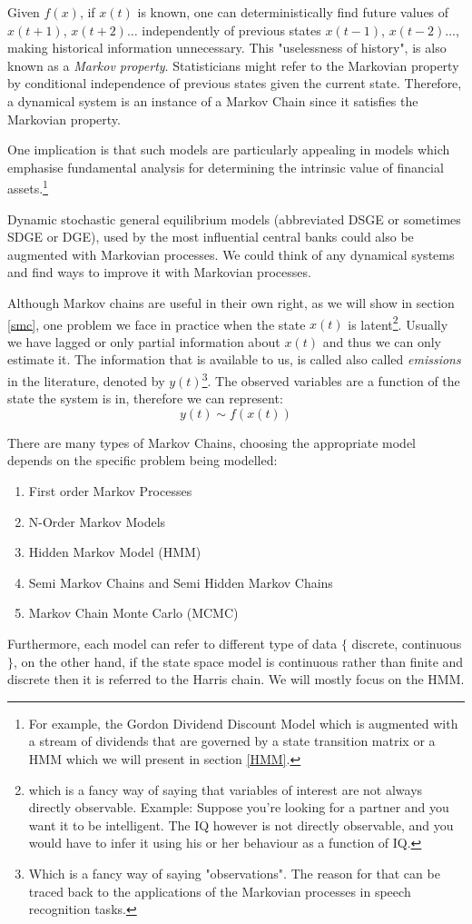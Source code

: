 \documentclass[a4paper,12pt]{article}
\theoremstyle{definition}
\begin{document}
Given $f(x)$, if $x(t)$ is known, one can deterministically find future values of $x(t+1)$, $x(t+2) \dots$ independently of previous states $x(t-1)$, $x(t-2) \dots$, making historical information unnecessary. This "uselessness of history", is also known as a \textit{Markov property}. Statisticians might refer to the Markovian property by conditional independence of previous states given the current state. Therefore, a dynamical system is an instance of a Markov Chain since it satisfies the Markovian property. 

One implication is that such models are particularly appealing in models which emphasise fundamental analysis for determining the intrinsic value of financial assets.\footnote{For example, the Gordon Dividend Discount Model which is augmented with a stream of dividends that are governed by a state transition matrix or a HMM which we will present in section \ref{HMM}.} 

Dynamic stochastic general equilibrium models (abbreviated DSGE or sometimes SDGE or DGE), used by the most influential central banks could also be augmented with Markovian processes.  We could think of any dynamical systems and find ways to improve it with Markovian processes. 

Although Markov chains are useful in their own right, as  we will show in section \ref{smc}, one problem we face in practice when the state $x(t)$ is latent\footnote{which is a fancy way of saying that variables of interest are not always directly observable. Example: Suppose you're looking for a partner and you want it to be intelligent. The IQ however is not directly observable, and you would have to infer it using his or her behaviour as a function of IQ. }.  Usually we have lagged or only partial information about $x(t)$ and thus we can only estimate it. The information that is available to us, is called also called \textit{emissions} in the literature, denoted by $y(t)$\footnote{Which is a fancy way of saying "observations". The reason for that can be traced back to the applications of the Markovian processes in speech recognition tasks.}. The observed variables are a function of the state the system is in, therefore we can represent: 
\begin{equation}
y(t) \sim f(x(t))
\end{equation}

There are many types of Markov Chains, choosing the appropriate model depends on the specific problem being modelled:
\begin{enumerate}
\item First order Markov Processes
\item N-Order Markov Models
\item Hidden Markov Model (HMM)
\item Semi Markov Chains and Semi Hidden Markov Chains
\item Markov Chain Monte Carlo (MCMC)
\end{enumerate}
Furthermore, each model can refer to different type of data $\{$ discrete, continuous $\}$, on the other hand, if the state space model is continuous rather than finite and discrete then it is referred to the Harris chain. We will mostly focus on the HMM. 
\end{document}

